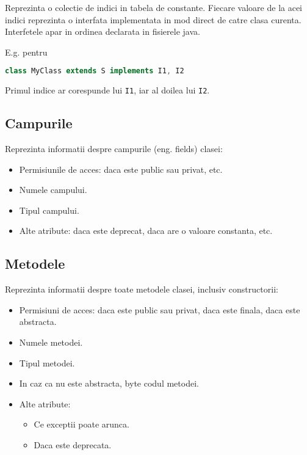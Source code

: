 Reprezinta o colectie de indici in tabela de constante. Fiecare valoare
de la acei indici reprezinta o interfata implementata in mod direct de
catre clasa curenta. Interfetele apar in ordinea declarata in fisierele
java.

E.g. pentru

\begin{lstlisting}[language=Java]
class MyClass extends S implements I1, I2
\end{lstlisting}

Primul indice ar corespunde lui \texttt{I1}, iar al doilea lui
\texttt{I2}.

\subsection{Campurile}\label{campurile}

Reprezinta informatii despre campurile (eng. fields) clasei:
\begin{itemize}
    \item Permisiunile de acces: daca este public sau privat, etc.
    \item Numele campului.
    \item Tipul campului.
    \item Alte atribute: daca este deprecat, daca are o valoare constanta, etc.
\end{itemize}

\subsection{Metodele}\label{metodele}

Reprezinta informatii despre toate metodele clasei, inclusiv
constructorii:

\begin{itemize}
    \item Permisiuni de acces: daca este public sau privat, daca este finala, daca este abstracta.
    \item Numele metodei.
    \item Tipul metodei.
    \item In caz ca nu este abstracta, byte codul metodei.
    \item Alte atribute:
        \begin{itemize}
            \item Ce exceptii poate arunca.
            \item Daca este deprecata.
        \end{itemize}
\end{itemize}

